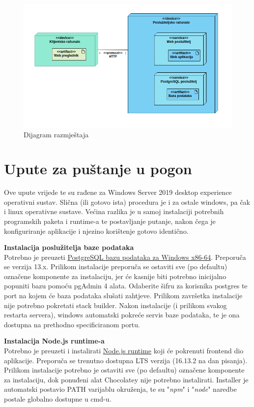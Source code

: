\begin{figure}[H]
	\centering
	\includegraphics[width=\textwidth, scale=0.5]{dijagrami/dijagram_razmjestaja}
	\caption{Dijagram razmještaja}
	\label{fig:dijagram_razmještaja}
\end{figure}
\eject
	
			
		
		\section{Upute za puštanje u pogon}
		
		Ove upute vrijede te su rađene za Windows Server 2019 desktop experience operativni sustav. Slična (ili gotovo ista) procedura je i za ostale windows, pa čak i linux operativne sustave. Većina razlika je u samoj instalaciji potrebnih programskih paketa i runtime-a te postavljanje putanje, nakon čega je konfiguriranje aplikacije i njezino korištenje gotovo identično.
		
			\textbf{Instalacija poslužitelja baze podataka}\\
			Potrebno je preuzeti \href{https://www.enterprisedb.com/downloads/postgres-postgresql-downloads}{PostgreSQL bazu podataka za Windows x86-64}. Preporuča se verzija 13.x. Prilikom instalacije preporuča se ostaviti sve (po defaultu) označene komponente za instalaciju, jer će kasnije biti potrebno inicijalno popuniti bazu pomoću pgAdmin 4 alata. Odaberite šifru za korisnika postgres te port na kojem će baza podataka slušati zahtjeve. Prilikom završetka instalacije nije potrebno pokretati stack builder. Nakon instalacije (i prilikom svakog restarta servera), windows automatski pokreće servis baze podataka, te je ona dostupna na prethodno specificiranom portu.
			
			\textbf{Instalacija Node.js runtime-a}\\
			Potrebno je preuzeti i instalirati \href{https://nodejs.org/en/download/}{Node.js runtime} koji će pokrenuti frontend dio aplikacije. Preporuča se trenutno dostupna LTS verzija (16.13.2 na dan pisanja). Prilikom instalacije potrebno je ostaviti sve (po defaultu) označene komponente za instalaciju, dok ponuđeni alat Chocolatey nije potrebno instalirati. Installer je automatski postavio PATH varijablu okruženja, te su "\textit{npm}" i "\textit{node}" naredbe postale globalno dostupne u cmd-u.
			
